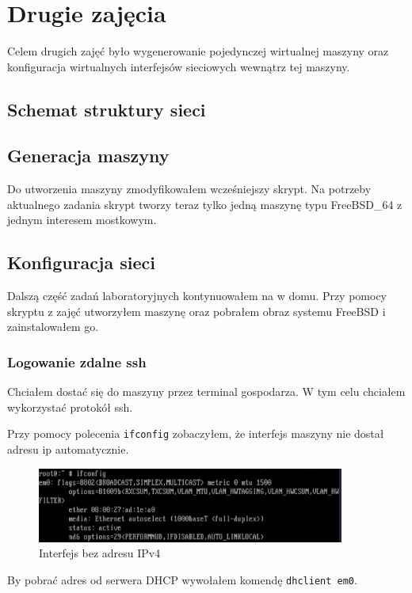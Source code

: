\documentclass{mwart}
\begin{document}
\section{Drugie zajęcia}
Celem drugich zajęć było wygenerowanie pojedynczej wirtualnej maszyny oraz konfiguracja wirtualnych interfejsów sieciowych wewnątrz tej maszyny.

\subsection{Schemat struktury sieci}

\subsection{Generacja maszyny}
Do utworzenia maszyny zmodyfikowałem wcześniejszy skrypt. Na potrzeby aktualnego zadania skrypt tworzy teraz tylko jedną maszynę typu FreeBSD\_64 z jednym interesem mostkowym.

\subsection{Konfiguracja sieci}
Dalszą część zadań laboratoryjnych kontynuowałem na w domu. Przy pomocy skryptu z zajęć utworzyłem maszynę oraz pobrałem obraz systemu FreeBSD i zainstalowałem go.

\subsubsection{Logowanie zdalne ssh}
Chciałem dostać się do maszyny przez terminal gospodarza. W tym celu chciałem wykorzystać protokół ssh.

Przy pomocy polecenia \texttt{ifconfig} zobaczyłem, że interfejs maszyny nie dostał adresu ip automatycznie.

\begin{figure}[H]
  \includegraphics[width=0.90\textwidth]{Interfejs_bez_ip}
  \centering
  \caption{Interfejs bez adresu IPv4}
  \label{fig:if_bez_ip}
\end{figure}

By pobrać adres od serwera DHCP wywołałem komendę \texttt{dhclient em0}.
\end{document}
